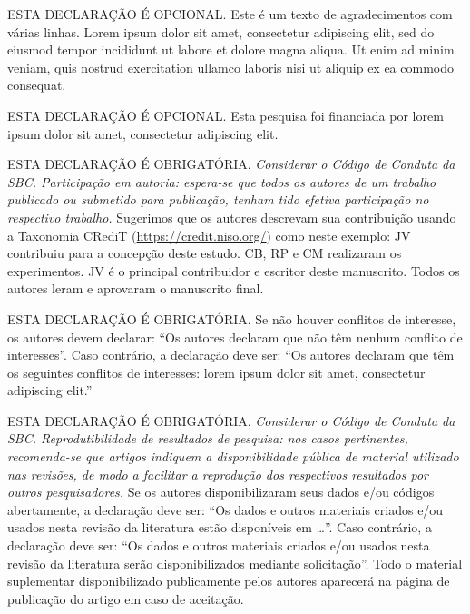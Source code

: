 \documentclass[portuguese]{sbc2025}%
\begin{document}
\begin{declarations}

\begin{acknowledgements}
ESTA DECLARAÇÃO É OPCIONAL. Este é um texto de agradecimentos com várias linhas. Lorem ipsum dolor sit amet, consectetur adipiscing elit, sed do eiusmod tempor incididunt ut labore et dolore magna aliqua. Ut enim ad minim veniam, quis nostrud exercitation ullamco laboris nisi ut aliquip ex ea commodo consequat.
\end{acknowledgements}


\begin{funding}
ESTA DECLARAÇÃO É OPCIONAL. Esta pesquisa foi financiada por lorem ipsum dolor sit amet, consectetur adipiscing elit.
\end{funding}

\begin{contributions}
ESTA DECLARAÇÃO É OBRIGATÓRIA. 
\textit{Considerar o Código de Conduta da SBC.
Participação em autoria: espera-se que todos os autores de um trabalho publicado 
ou submetido para publicação, tenham tido efetiva participação no respectivo trabalho.}
Sugerimos que os autores descrevam sua contribuição usando 
a Taxonomia CRediT (\href{https://credit.niso.org/}{https://credit.niso.org/}) como neste exemplo: 
JV contribuiu para a concepção deste estudo. CB, RP e CM realizaram os experimentos. 
JV é o principal contribuidor e escritor deste manuscrito. 
Todos os autores leram e aprovaram o manuscrito final. 
\end{contributions}

\begin{interests}
ESTA DECLARAÇÃO É OBRIGATÓRIA. 
Se não houver conflitos de interesse, os autores devem declarar: 
``Os autores declaram que não têm nenhum conflito de interesses''. 
Caso contrário, a declaração deve ser: 
``Os autores declaram que têm os seguintes conflitos de interesses: 
lorem ipsum dolor sit amet, consectetur adipiscing elit.''
\end{interests}

\begin{materials}
ESTA DECLARAÇÃO É OBRIGATÓRIA. 
\textit{Considerar o Código de Conduta da SBC. 
Reprodutibilidade de resultados de pesquisa: 
nos casos pertinentes, recomenda-se que artigos indiquem 
a disponibilidade pública de material utilizado nas revisões, 
de modo a facilitar a reprodução dos respectivos resultados por outros pesquisadores.}
%
Se os autores disponibilizaram seus dados e/ou códigos abertamente, a declaração deve ser: 
``Os dados e outros materiais criados e/ou usados nesta revisão da literatura
estão disponíveis em \ldots''. 
Caso contrário, a declaração deve ser: 
``Os dados e outros materiais criados e/ou usados nesta revisão da literatura 
serão disponibilizados mediante solicitação''. 
%
Todo o material suplementar disponibilizado publicamente pelos autores aparecerá 
na página de publicação do artigo em caso de aceitação. 
\end{materials}


\end{declarations}
\end{document}
